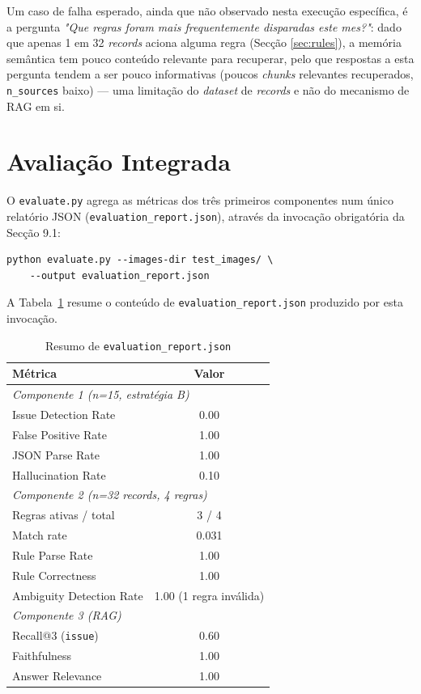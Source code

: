 \documentclass[conference]{IEEEtran}
\begin{document}
Um caso de falha esperado, ainda que não observado nesta execução
específica, é a pergunta \textit{"Que regras foram mais frequentemente
disparadas este mes?"}: dado que apenas 1 em 32 \textit{records} aciona
alguma regra (Secção \ref{sec:rules}), a memória semântica tem pouco
conteúdo relevante para recuperar, pelo que respostas a esta pergunta tendem
a ser pouco informativas (poucos \textit{chunks} relevantes recuperados,
\texttt{n\_sources} baixo) --- uma limitação do \textit{dataset} de
\textit{records} e não do mecanismo de RAG em si.

\section{Avaliação Integrada}
\label{sec:eval}

O \texttt{evaluate.py} agrega as métricas dos três primeiros componentes num
único relatório JSON (\texttt{evaluation\_report.json}), através da
invocação obrigatória da Secção 9.1:

\begin{lstlisting}
python evaluate.py --images-dir test_images/ \
    --output evaluation_report.json
\end{lstlisting}

A Tabela~\ref{tab:eval-summary} resume o conteúdo de
\texttt{evaluation\_report.json} produzido por esta invocação.

\begin{table}[h]
\centering
\caption{Resumo de \texttt{evaluation\_report.json}}
\label{tab:eval-summary}
\begin{tabular}{lc}
\toprule
Métrica & Valor \\
\midrule
\multicolumn{2}{l}{\textit{Componente 1 (n=15, estratégia B)}} \\
\quad Issue Detection Rate & 0.00 \\
\quad False Positive Rate & 1.00 \\
\quad JSON Parse Rate & 1.00 \\
\quad Hallucination Rate & 0.10 \\
\midrule
\multicolumn{2}{l}{\textit{Componente 2 (n=32 records, 4 regras)}} \\
\quad Regras ativas / total & 3 / 4 \\
\quad Match rate & 0.031 \\
\quad Rule Parse Rate & 1.00 \\
\quad Rule Correctness & 1.00 \\
\quad Ambiguity Detection Rate & 1.00 (1 regra inválida) \\
\midrule
\multicolumn{2}{l}{\textit{Componente 3 (RAG)}} \\
\quad Recall@3 (\texttt{issue}) & 0.60 \\
\quad Faithfulness & 1.00 \\
\quad Answer Relevance & 1.00 \\
\bottomrule
\end{tabular}
\end{table}
\end{document}
